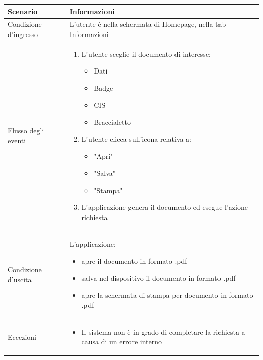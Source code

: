 \documentclass[12pt,a4paper,twoside,openright,titlepage]{book}
\begin{document}
\begin{table}[H]
\centering
\begin{tabular}{|p{4cm}|p{10cm}|}
\hline
Scenario & Informazioni \\
\hline
Condizione d'ingresso & L'utente è nella schermata di Homepage, nella tab Informazioni\\
\hline
Flusso degli eventi & 
\begin{enumerate}
\item L'utente sceglie il documento di interesse:
\begin{itemize}
\item Dati
\item Badge
\item CIS
\item Braccialetto
\end{itemize}
\item L'utente clicca sull'icona relativa a:
\begin{itemize}
\item "Apri"
\item "Salva"
\item "Stampa"
\end{itemize}
\item L'applicazione genera il documento ed esegue l'azione richiesta
\end{enumerate}\\
\hline
Condizione d'uscita & L'applicazione:
\begin{itemize}
\item apre il documento in formato .pdf
\item salva nel dispositivo il documento in formato .pdf
\item apre la schermata di stampa per documento in formato .pdf
\end{itemize}\\
\hline
Eccezioni & 
\begin{itemize}
\item Il sistema non è in grado di completare la richiesta a causa di un errore interno
\end{itemize} \\
\hline
\end{tabular}
\end{table}
\end{document}
